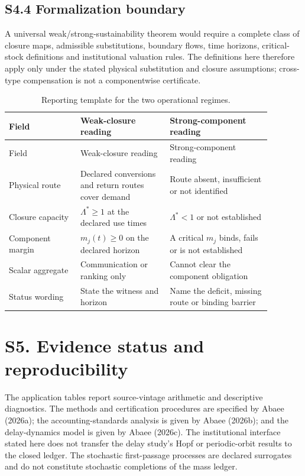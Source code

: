 \documentclass[11pt]{article}
\begin{document}
\subsection*{S4.4 Formalization boundary}

A universal weak/strong-sustainability theorem would require a complete class of closure maps, admissible substitutions, boundary flows, time horizons, critical-stock definitions and institutional valuation rules. The definitions here therefore apply only under the stated physical substitution and closure assumptions; cross-type compensation is not a componentwise certificate.

\begin{longtable}{@{}P{0.24\linewidth}P{0.30\linewidth}P{0.34\linewidth}@{}}
\caption{Reporting template for the two operational regimes.}\label{tab:regimes}\\
\toprule
Field & Weak-closure reading & Strong-component reading \\
\midrule
\endfirsthead
\toprule
Field & Weak-closure reading & Strong-component reading \\
\midrule
\endhead
\bottomrule
\endfoot
Physical route & Declared conversions and return routes cover demand & Route absent, insufficient or not identified \\
Closure capacity & $\Lambda^*\geq1$ at the declared use times & $\Lambda^*<1$ or not established \\
Component margin & $m_j(t)\geq0$ on the declared horizon & A critical $m_j$ binds, fails or is not established \\
Scalar aggregate & Communication or ranking only & Cannot clear the component obligation \\
Status wording & State the witness and horizon & Name the deficit, missing route or binding barrier \\
\end{longtable}

\section*{S5. Evidence status and reproducibility}

The application tables report source-vintage arithmetic and descriptive diagnostics. The methods and certification procedures are specified by Abaee (2026a); the accounting-standards analysis is given by Abaee (2026b); and the delay-dynamics model is given by Abaee (2026c). The institutional interface stated here does not transfer the delay study's Hopf or periodic-orbit results to the closed ledger. The stochastic first-passage processes are declared surrogates and do not constitute stochastic completions of the mass ledger.
\end{document}

